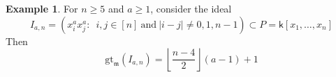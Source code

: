 \documentclass[10pt,reqno]{amsart}
\theoremstyle{definition}
\newtheorem{example}[subsection]{Example}
\theoremstyle{remark}
\numberwithin{equation}{section}
\newcommand{\kk}{\mathsf k}
\newcommand{\m}{\mathfrak m}
\numberwithin{equation}{section}
\begin{document}
\begin{example}\label{cyclicGorensteinexample}
For $n\geq 5$ and $a\geq 1$, consider the ideal 
$$
I_{a,n}=(x_i^ax_j^a:\; \ i, j \in [n] \ \text{and} \ |i-j|\neq 0,1,n-1)\subset P=\kk [x_1, \ldots, x_n]
$$
Then 
$$
\mathrm{gt}_{\m}(I_{a, n})=\left\lfloor \frac{n-4}{2}\right\rfloor  (a-1)+1
$$
\end{example}
\end{document}
